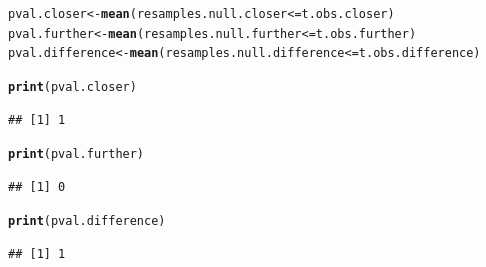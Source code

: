 \documentclass{article}\usepackage[]{graphicx}\usepackage[]{xcolor}
\makeatletter
\newcommand{\hlopt}[1]{\textcolor[rgb]{0,0,0}{#1}}%
\newcommand{\hldef}[1]{\textcolor[rgb]{0.345,0.345,0.345}{#1}}%
\newcommand{\hlkwb}[1]{\textcolor[rgb]{0.69,0.353,0.396}{#1}}%
\newcommand{\hlkwd}[1]{\textcolor[rgb]{0.737,0.353,0.396}{\textbf{#1}}}%
\newenvironment{kframe}{%
 \def\at@end@of@kframe{}%
 \ifinner\ifhmode%
  \def\at@end@of@kframe{\end{minipage}}%
  \begin{minipage}{\columnwidth}%
 \fi\fi%
 \def\FrameCommand##1{\hskip\@totalleftmargin \hskip-\fboxsep
 \colorbox{shadecolor}{##1}\hskip-\fboxsep
     \hskip-\linewidth \hskip-\@totalleftmargin \hskip\columnwidth}%
 \MakeFramed {\advance\hsize-\width
   \@totalleftmargin\z@ \linewidth\hsize
   \@setminipage}}%
 {\par\unskip\endMakeFramed%
 \at@end@of@kframe}
\newenvironment{knitrout}{}{} %
\makeatother
\begin{document}
\begin{enumerate}
\begin{enumerate}
\begin{knitrout}
\begin{kframe}
\begin{alltt}
\hldef{pval.closer} \hlkwb{<-} \hlkwd{mean}\hldef{(resamples.null.closer} \hlopt{<=} \hldef{t.obs.closer)}
\hldef{pval.further} \hlkwb{<-} \hlkwd{mean}\hldef{(resamples.null.further} \hlopt{<=} \hldef{t.obs.further)}
\hldef{pval.difference} \hlkwb{<-} \hlkwd{mean}\hldef{(resamples.null.difference} \hlopt{<=} \hldef{t.obs.difference)}

\hlkwd{print}\hldef{(pval.closer)}
\end{alltt}
\begin{verbatim}
## [1] 1
\end{verbatim}
\begin{alltt}
\hlkwd{print}\hldef{(pval.further)}
\end{alltt}
\begin{verbatim}
## [1] 0
\end{verbatim}
\begin{alltt}
\hlkwd{print}\hldef{(pval.difference)}
\end{alltt}
\begin{verbatim}
## [1] 1
\end{verbatim}
\end{kframe}
\end{knitrout}


\end{enumerate}
\end{enumerate}
\end{document}
